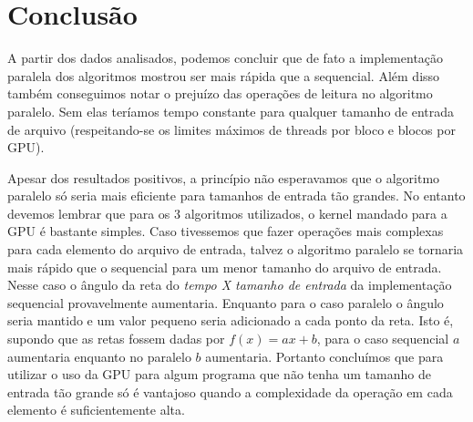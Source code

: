 \documentclass[12pt]{article}
\begin{document}
\newpage
\section{Conclusão}
A partir dos dados analisados, podemos concluir que de fato a implementação paralela dos algoritmos mostrou ser mais rápida que a sequencial. Além disso também conseguimos notar o prejuízo das operações de leitura no algoritmo paralelo. Sem elas teríamos tempo constante para qualquer tamanho de entrada de arquivo (respeitando-se os limites máximos de threads por bloco e blocos por GPU).

Apesar dos resultados positivos, a princípio não esperavamos que o algoritmo paralelo só seria mais eficiente para tamanhos de entrada tão grandes. No entanto devemos lembrar que para os 3 algoritmos utilizados, o kernel mandado para a GPU é bastante simples. Caso tivessemos que fazer operações mais complexas para cada elemento do arquivo de entrada, talvez o algoritmo paralelo se tornaria mais rápido que o sequencial para um menor tamanho do arquivo de entrada. Nesse caso o ângulo da reta do \emph{tempo X tamanho de entrada} da implementação sequencial provavelmente aumentaria. Enquanto para o caso paralelo o ângulo seria mantido e um valor pequeno seria adicionado a cada ponto da reta. Isto é, supondo que as retas fossem dadas por $f(x) = ax + b$, para o caso sequencial $a$ aumentaria enquanto no paralelo $b$ aumentaria. Portanto concluímos que para utilizar o uso da GPU para algum programa que não tenha um tamanho de entrada tão grande só é vantajoso quando a complexidade da operação em cada elemento é suficientemente alta.
\end{document}
